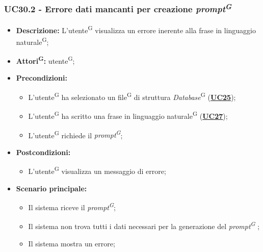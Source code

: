 \subsubsection{UC30.2 - Errore dati mancanti per creazione \textit{prompt\textsuperscript{G}}}
\label{sec:UC30.2}
\begin{itemize}
	\item \textbf{Descrizione:} L’utente\textsuperscript{G} visualizza un errore inerente alla frase in linguaggio naturale\textsuperscript{G};
	\item \textbf{Attori\textsuperscript{G}:} utente\textsuperscript{G};
	\item \textbf{Precondizioni:} 
	\begin{itemize}
		\item L’utente\textsuperscript{G} ha selezionato un file\textsuperscript{G} di struttura \textit{Database}\textsuperscript{G} (\hyperref[sec:UC25]{\textbf{UC25}});
		\item L’utente\textsuperscript{G} ha scritto una frase in linguaggio naturale\textsuperscript{G} (\hyperref[sec:UC27]{\textbf{UC27}});
		\item L’utente\textsuperscript{G} richiede il \textit{prompt\textsuperscript{G}};
	\end{itemize}
	\item \textbf{Postcondizioni:} 
	\begin{itemize}
		\item L’utente\textsuperscript{G} visualizza un messaggio di errore;
	\end{itemize}
	\item \textbf{Scenario principale:} 
	\begin{itemize}
		\item Il sistema riceve il \textit{prompt\textsuperscript{G}};
		\item Il sistema non trova tutti i dati necessari per la generazione del \textit{prompt\textsuperscript{G}} ;
		\item Il sistema mostra un errore;
	\end{itemize}
\end{itemize}


